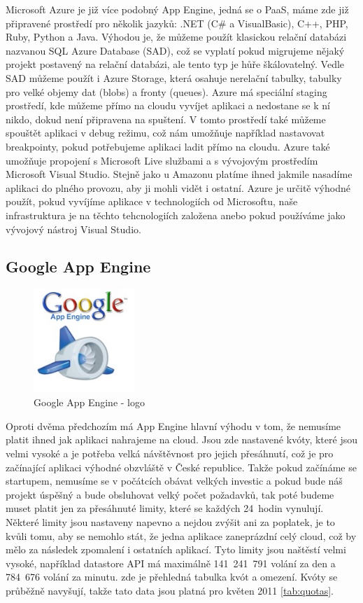 Microsoft Azure je již více podobný App Engine, jedná se o PaaS, máme zde již připravené prostředí pro několik jazyků: .NET (C\# a VisualBasic), C++, PHP, Ruby, Python a Java. Výhodou je, že můžeme použít klasickou relační databázi nazvanou SQL Azure Database (SAD), což se vyplatí pokud migrujeme nějaký projekt postavený na relační databázi, ale tento typ je hůře škálovatelný. Vedle SAD můžeme použít i Azure Storage, která osahuje nerelační tabulky, tabulky pro velké objemy dat (blobs) a fronty (queues). Azure má speciální staging prostředí, kde můžeme přímo na cloudu vyvíjet aplikaci a nedostane se k ní nikdo, dokud není připravena na spuštení. V tomto prostředí také můžeme spouštět aplikaci v debug režimu, což nám umožňuje například nastavovat breakpointy, pokud potřebujeme aplikaci ladit přímo na cloudu. Azure také umožňuje propojení s Microsoft Live službami a s vývojovým prostředím Microsoft Visual Studio. Stejně jako u Amazonu platíme ihned jakmile nasadíme aplikaci do plného provozu, aby ji mohli vidět i ostatní. Azure je určitě výhodné použít, pokud vyvíjíme aplikace v technologiích od Microsoftu, naše infrastruktura je na těchto tehcnologiích založena anebo pokud používáme jako vývojový nástroj Visual Studio.

\subsection{Google App Engine}

\begin{figure}[h]
\begin{center}
\includegraphics[width=1.5in]{figures/app-engine-logo.jpg}
\caption{Google App Engine - logo}
\label{fig:app-engine-logo}
\end{center}
\end{figure}

Oproti dvěma předchozím má App Engine hlavní výhodu v tom, že nemusíme platit ihned jak aplikaci nahrajeme na cloud. Jsou zde nastavené kvóty, které jsou velmi vysoké a je potřeba velká návštěvnost pro jejich přesáhnutí, což je pro začínající aplikaci výhodné obzvláště v České republice. Takže pokud začínáme se startupem, nemusíme se v počátcích obávat velkých investic a pokud bude náš projekt úspěšný a bude obsluhovat velký počet požadavků, tak poté budeme muset platit jen za přesáhnuté limity, které se každých 24~hodin vynulují. Některé limity jsou nastaveny napevno a nejdou zvýšit ani za poplatek, je to kvůli tomu, aby se nemohlo stát, že jedna aplikace zaneprázdní celý cloud, což by mělo za následek zpomalení i ostatních aplikací. Tyto limity jsou naštěstí velmi vysoké, například datastore API má maximálně 141~241~791 volání za den a 784~676 volání za minutu.  zde je přehledná tabulka kvót a omezení. Kvóty se průběžně navyšují, takže tato data jsou  platná pro květen 2011 \ref{tab:quotas}.

